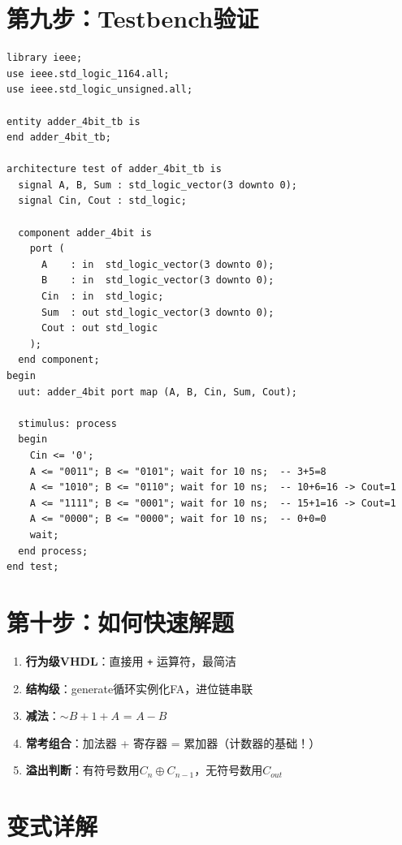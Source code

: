 \section{第九步：Testbench验证}

\begin{lstlisting}[caption={4位加法器Testbench}]
library ieee;
use ieee.std_logic_1164.all;
use ieee.std_logic_unsigned.all;

entity adder_4bit_tb is
end adder_4bit_tb;

architecture test of adder_4bit_tb is
  signal A, B, Sum : std_logic_vector(3 downto 0);
  signal Cin, Cout : std_logic;

  component adder_4bit is
    port (
      A    : in  std_logic_vector(3 downto 0);
      B    : in  std_logic_vector(3 downto 0);
      Cin  : in  std_logic;
      Sum  : out std_logic_vector(3 downto 0);
      Cout : out std_logic
    );
  end component;
begin
  uut: adder_4bit port map (A, B, Cin, Sum, Cout);

  stimulus: process
  begin
    Cin <= '0';
    A <= "0011"; B <= "0101"; wait for 10 ns;  -- 3+5=8
    A <= "1010"; B <= "0110"; wait for 10 ns;  -- 10+6=16 -> Cout=1
    A <= "1111"; B <= "0001"; wait for 10 ns;  -- 15+1=16 -> Cout=1
    A <= "0000"; B <= "0000"; wait for 10 ns;  -- 0+0=0
    wait;
  end process;
end test;
\end{lstlisting}

\section{第十步：如何快速解题}

\begin{examtip}[加法器快速解题法]
\begin{enumerate}
  \item \textbf{行为级VHDL}：直接用 \texttt{+} 运算符，最简洁
  \item \textbf{结构级}：generate循环实例化FA，进位链串联
  \item \textbf{减法}：$\sim B + 1 + A$ = $A - B$
  \item \textbf{常考组合}：加法器 + 寄存器 = 累加器（计数器的基础！）
  \item \textbf{溢出判断}：有符号数用$C_{n} \oplus C_{n-1}$，无符号数用$C_{out}$
\end{enumerate}
\end{examtip}

\section{变式详解}

